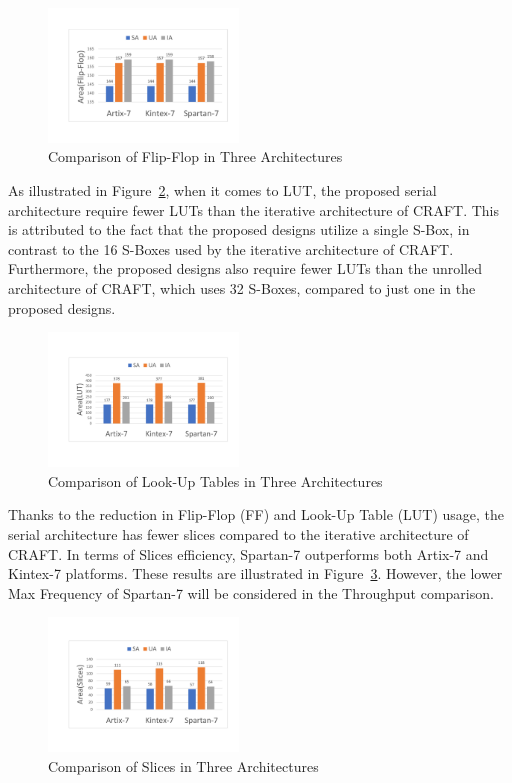 \documentclass[final,5p,times,twocolumn]{elsarticle}
\begin{document}
\begin{figure}
    \centering
    \includegraphics[width=0.45\textwidth]{./fig/compare-ff.pdf}
    \caption{Comparison of Flip-Flop in Three Architectures}\label{compare_ff}
\end{figure}

As illustrated in Figure~\ref{compare_lut}, when it comes to LUT, the proposed serial architecture require fewer LUTs than the iterative architecture of CRAFT. This is attributed to the fact that the proposed designs utilize a single S-Box, in contrast to the 16 S-Boxes used by the iterative architecture of CRAFT. Furthermore, the proposed designs also require fewer LUTs than the unrolled architecture of CRAFT, which uses 32 S-Boxes, compared to just one in the proposed designs.

\begin{figure}
    \centering
    \includegraphics[width=0.45\textwidth]{./fig/compare-lut.pdf}
    \caption{Comparison of Look-Up Tables in Three Architectures}\label{compare_lut}
\end{figure}

Thanks to the reduction in Flip-Flop (FF) and Look-Up Table (LUT) usage, the serial architecture has fewer slices compared to the iterative architecture of CRAFT.
In terms of Slices efficiency, Spartan-7 outperforms both Artix-7 and Kintex-7 platforms.
These results are illustrated in Figure~\ref{compare-slices}. However, the lower Max Frequency of Spartan-7 will be considered in the Throughput comparison.

\begin{figure}
    \centering
    \includegraphics[width=0.45\textwidth]{./fig/compare-slices.pdf}
    \caption{Comparison of Slices in Three Architectures}\label{compare-slices}
\end{figure}
\end{document}
